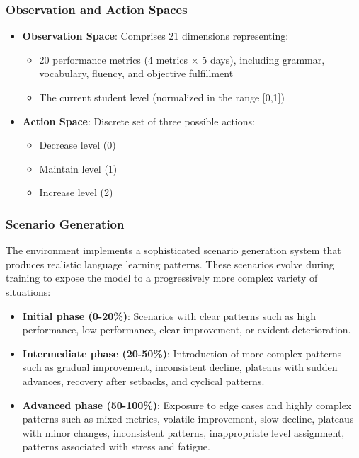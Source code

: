 \subsubsection{Observation and Action Spaces}

\begin{itemize}
    \item \textbf{Observation Space}: Comprises 21 dimensions representing:
    \begin{itemize}
        \item 20 performance metrics (4 metrics × 5 days), including grammar, vocabulary, fluency, and objective fulfillment
        \item The current student level (normalized in the range [0,1])
    \end{itemize}
    
    \item \textbf{Action Space}: Discrete set of three possible actions:
    \begin{itemize}
        \item Decrease level (0)
        \item Maintain level (1)
        \item Increase level (2)
    \end{itemize}
\end{itemize}


\subsubsection{Scenario Generation}
\label{generacion-escenarios}

The environment implements a sophisticated scenario generation system that produces realistic language learning patterns. These scenarios evolve during training to expose the model to a progressively more complex variety of situations:

\begin{itemize}
    \item \textbf{Initial phase (0-20\%)}: Scenarios with clear patterns such as high performance, low performance, clear improvement, or evident deterioration.
    
    \item \textbf{Intermediate phase (20-50\%)}: Introduction of more complex patterns such as gradual improvement, inconsistent decline, plateaus with sudden advances, recovery after setbacks, and cyclical patterns.
    
    \item \textbf{Advanced phase (50-100\%)}: Exposure to edge cases and highly complex patterns such as mixed metrics, volatile improvement, slow decline, plateaus with minor changes, inconsistent patterns, inappropriate level assignment, patterns associated with stress and fatigue.
\end{itemize}

